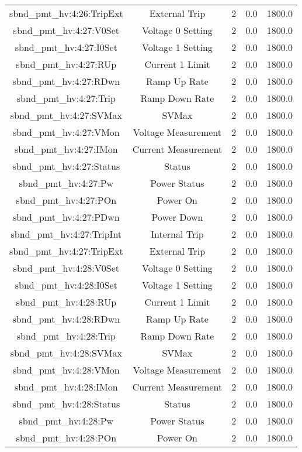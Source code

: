 \begin{table}[ptb]
\begin{tabular}{c | c c c c}
sbnd_pmt_hv:4:26:TripExt & External Trip & 2 & 0.0 & 1800.0\\ 
sbnd_pmt_hv:4:27:V0Set & Voltage 0 Setting & 2 & 0.0 & 1800.0\\ 
sbnd_pmt_hv:4:27:I0Set & Voltage 1 Setting & 2 & 0.0 & 1800.0\\ 
sbnd_pmt_hv:4:27:RUp & Current 1 Limit & 2 & 0.0 & 1800.0\\ 
sbnd_pmt_hv:4:27:RDwn & Ramp Up Rate & 2 & 0.0 & 1800.0\\ 
sbnd_pmt_hv:4:27:Trip & Ramp Down Rate & 2 & 0.0 & 1800.0\\ 
sbnd_pmt_hv:4:27:SVMax & SVMax & 2 & 0.0 & 1800.0\\ 
sbnd_pmt_hv:4:27:VMon & Voltage Measurement & 2 & 0.0 & 1800.0\\ 
sbnd_pmt_hv:4:27:IMon & Current Measurement & 2 & 0.0 & 1800.0\\ 
sbnd_pmt_hv:4:27:Status & Status & 2 & 0.0 & 1800.0\\ 
sbnd_pmt_hv:4:27:Pw & Power Status & 2 & 0.0 & 1800.0\\ 
sbnd_pmt_hv:4:27:POn & Power On & 2 & 0.0 & 1800.0\\ 
sbnd_pmt_hv:4:27:PDwn & Power Down & 2 & 0.0 & 1800.0\\ 
sbnd_pmt_hv:4:27:TripInt & Internal Trip & 2 & 0.0 & 1800.0\\ 
sbnd_pmt_hv:4:27:TripExt & External Trip & 2 & 0.0 & 1800.0\\ 
sbnd_pmt_hv:4:28:V0Set & Voltage 0 Setting & 2 & 0.0 & 1800.0\\ 
sbnd_pmt_hv:4:28:I0Set & Voltage 1 Setting & 2 & 0.0 & 1800.0\\ 
sbnd_pmt_hv:4:28:RUp & Current 1 Limit & 2 & 0.0 & 1800.0\\ 
sbnd_pmt_hv:4:28:RDwn & Ramp Up Rate & 2 & 0.0 & 1800.0\\ 
sbnd_pmt_hv:4:28:Trip & Ramp Down Rate & 2 & 0.0 & 1800.0\\ 
sbnd_pmt_hv:4:28:SVMax & SVMax & 2 & 0.0 & 1800.0\\ 
sbnd_pmt_hv:4:28:VMon & Voltage Measurement & 2 & 0.0 & 1800.0\\ 
sbnd_pmt_hv:4:28:IMon & Current Measurement & 2 & 0.0 & 1800.0\\ 
sbnd_pmt_hv:4:28:Status & Status & 2 & 0.0 & 1800.0\\ 
sbnd_pmt_hv:4:28:Pw & Power Status & 2 & 0.0 & 1800.0\\ 
sbnd_pmt_hv:4:28:POn & Power On & 2 & 0.0 & 1800.0\\ 

\end{tabular}
\end{table}
